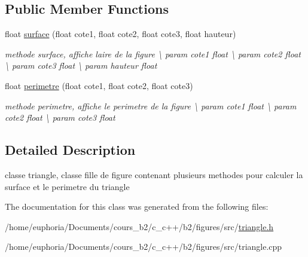 \subsection*{Public Member Functions}
\begin{DoxyCompactItemize}
\item 
float \hyperlink{classtriangle_a21d60b3b0972ed273858f81c4bf0b616}{surface} (float cote1, float cote2, float cote3, float hauteur)\hypertarget{classtriangle_a21d60b3b0972ed273858f81c4bf0b616}{}\label{classtriangle_a21d60b3b0972ed273858f81c4bf0b616}

\begin{DoxyCompactList}\small\item\em methode surface, affiche l\textquotesingle{}aire de la figure \textbackslash{} param cote1 float \textbackslash{} param cote2 float \textbackslash{} param cote3 float \textbackslash{} param hauteur float \end{DoxyCompactList}\item 
float \hyperlink{classtriangle_a05b279c1d87e79ce6a724a797406fd42}{perimetre} (float cote1, float cote2, float cote3)\hypertarget{classtriangle_a05b279c1d87e79ce6a724a797406fd42}{}\label{classtriangle_a05b279c1d87e79ce6a724a797406fd42}

\begin{DoxyCompactList}\small\item\em methode perimetre, affiche le perimetre de la figure \textbackslash{} param cote1 float \textbackslash{} param cote2 float \textbackslash{} param cote3 float \end{DoxyCompactList}\end{DoxyCompactItemize}


\subsection{Detailed Description}
classe triangle, classe fille de figure contenant plusieurs methodes pour calculer la surface et le perimetre du triangle 

The documentation for this class was generated from the following files\+:\begin{DoxyCompactItemize}
\item 
/home/euphoria/\+Documents/cours\+\_\+b2/c\+\_\+c++/b2/figures/src/\hyperlink{triangle_8h}{triangle.\+h}\item 
/home/euphoria/\+Documents/cours\+\_\+b2/c\+\_\+c++/b2/figures/src/triangle.\+cpp\end{DoxyCompactItemize}

